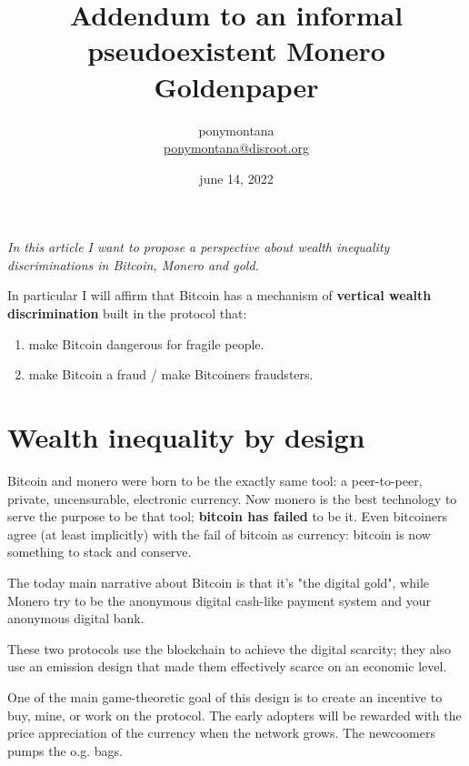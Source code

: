 \documentclass{article}
\author{ponymontana \\ \href{mailto:ponymontana@disroot.org}{ponymontana@disroot.org}}
\title{Addendum to an informal pseudoexistent Monero Goldenpaper}
\date{june 14, 2022}\vspace{0.5cm}
\begin{document}
\maketitle

\vspace{0.4cm}
\large{}

\emph{In this article I want to propose a perspective about wealth inequality discriminations in Bitcoin, Monero and gold.} \vspace{0.5cm}

\normalsize{}

In particular I will affirm that Bitcoin has a mechanism of \textbf{vertical wealth discrimination} built in the protocol that:


\begin{enumerate}

        \item make Bitcoin dangerous for fragile people.

	\item make Bitcoin a fraud / make Bitcoiners fraudsters.\vspace{0.3cm}

\end{enumerate}


\section{Wealth inequality by design}


Bitcoin and monero were born to be the exactly same tool: a peer-to-peer, private, uncensurable, electronic currency. Now monero is the best technology to serve the purpose to be that tool; \textbf{bitcoin has failed} to be it. Even bitcoiners agree (at least implicitly) with the fail of bitcoin as currency: bitcoin is now something to stack and conserve.\vspace{0.2cm}

The today main narrative about Bitcoin is that it's "the digital gold", while Monero try to be the anonymous digital cash-like payment system and your anonymous digital bank.\vspace{0.2cm}


These two protocols use the blockchain to achieve the digital scarcity; they also use an emission design that made them effectively scarce on an economic level.


One of the main game-theoretic goal of this design is to create an incentive to buy, mine, or work on the protocol. The early adopters will be rewarded with the price appreciation of the currency when the network grows. The newcoomers pumps the o.g. bags.\vspace{0.2cm}
\end{document}
